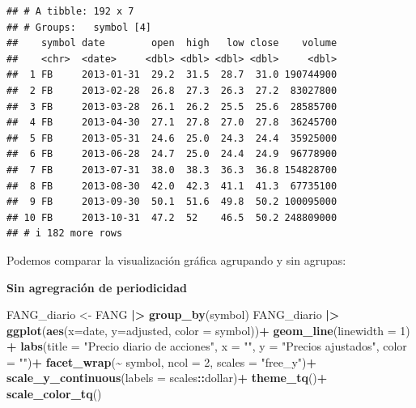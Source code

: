 \documentclass[
]{book}
\newenvironment{Shaded}{\begin{snugshade}}{\end{snugshade}}
\newcommand{\AttributeTok}[1]{\textcolor[rgb]{0.13,0.29,0.53}{#1}}
\newcommand{\DecValTok}[1]{\textcolor[rgb]{0.00,0.00,0.81}{#1}}
\newcommand{\FunctionTok}[1]{\textcolor[rgb]{0.13,0.29,0.53}{\textbf{#1}}}
\newcommand{\NormalTok}[1]{#1}
\newcommand{\OtherTok}[1]{\textcolor[rgb]{0.56,0.35,0.01}{#1}}
\newcommand{\SpecialCharTok}[1]{\textcolor[rgb]{0.81,0.36,0.00}{\textbf{#1}}}
\newcommand{\StringTok}[1]{\textcolor[rgb]{0.31,0.60,0.02}{#1}}
\begin{document}
\begin{verbatim}
## # A tibble: 192 x 7
## # Groups:   symbol [4]
##    symbol date        open  high   low close    volume
##    <chr>  <date>     <dbl> <dbl> <dbl> <dbl>     <dbl>
##  1 FB     2013-01-31  29.2  31.5  28.7  31.0 190744900
##  2 FB     2013-02-28  26.8  27.3  26.3  27.2  83027800
##  3 FB     2013-03-28  26.1  26.2  25.5  25.6  28585700
##  4 FB     2013-04-30  27.1  27.8  27.0  27.8  36245700
##  5 FB     2013-05-31  24.6  25.0  24.3  24.4  35925000
##  6 FB     2013-06-28  24.7  25.0  24.4  24.9  96778900
##  7 FB     2013-07-31  38.0  38.3  36.3  36.8 154828700
##  8 FB     2013-08-30  42.0  42.3  41.1  41.3  67735100
##  9 FB     2013-09-30  50.1  51.6  49.8  50.2 100095000
## 10 FB     2013-10-31  47.2  52    46.5  50.2 248809000
## # i 182 more rows
\end{verbatim}

Podemos comparar la visualización gráfica agrupando y sin agrupas:

\textbf{Sin agregración de periodicidad}

\begin{Shaded}
\begin{Highlighting}[]
\NormalTok{FANG\_diario }\OtherTok{\textless{}{-}}\NormalTok{ FANG }\SpecialCharTok{|\textgreater{}} \FunctionTok{group\_by}\NormalTok{(symbol) }
\NormalTok{FANG\_diario }\SpecialCharTok{|\textgreater{}} \FunctionTok{ggplot}\NormalTok{(}\FunctionTok{aes}\NormalTok{(}\AttributeTok{x=}\NormalTok{date, }\AttributeTok{y=}\NormalTok{adjusted, }\AttributeTok{color =}\NormalTok{ symbol))}\SpecialCharTok{+}
               \FunctionTok{geom\_line}\NormalTok{(}\AttributeTok{linewidth =} \DecValTok{1}\NormalTok{) }\SpecialCharTok{+}
               \FunctionTok{labs}\NormalTok{(}\AttributeTok{title =} \StringTok{"Precio diario de acciones"}\NormalTok{,}
                    \AttributeTok{x =} \StringTok{""}\NormalTok{, }\AttributeTok{y =} \StringTok{"Precios ajustados"}\NormalTok{, }\AttributeTok{color =} \StringTok{""}\NormalTok{)}\SpecialCharTok{+}
               \FunctionTok{facet\_wrap}\NormalTok{(}\SpecialCharTok{\textasciitilde{}}\NormalTok{ symbol, }\AttributeTok{ncol =} \DecValTok{2}\NormalTok{, }\AttributeTok{scales =} \StringTok{"free\_y"}\NormalTok{)}\SpecialCharTok{+}
               \FunctionTok{scale\_y\_continuous}\NormalTok{(}\AttributeTok{labels =}\NormalTok{ scales}\SpecialCharTok{::}\NormalTok{dollar)}\SpecialCharTok{+}
               \FunctionTok{theme\_tq}\NormalTok{()}\SpecialCharTok{+}
               \FunctionTok{scale\_color\_tq}\NormalTok{()}
\end{Highlighting}
\end{Shaded}
\end{document}
